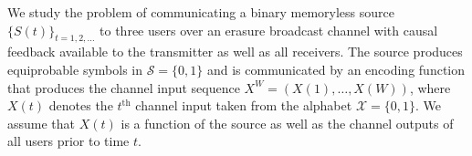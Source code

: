 We study the problem of communicating a binary memoryless source $\{S(t)\}_{t=1,2, \ldots}$ to three users over an erasure broadcast channel with causal feedback available to the transmitter as well as all receivers.  %
%
%
The source produces equiprobable symbols in $\mathcal{S}=\{0,1\}$ and is communicated by an encoding function that produces the channel input sequence $X^{W} = (X(1),  \dots , X(W))$, where $X(t)$ denotes the $t^{\mathrm{th}}$ channel input taken from the alphabet $\mathcal{X} = \{0, 1\}$.  We assume that 
$X(t)$ is a function of the source as well as the channel outputs of all users prior to time $t$.  


